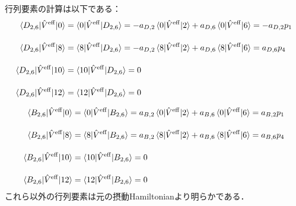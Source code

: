 行列要素の計算は以下である：
\begin{align}
    \langle{D_{2,6}|\hat{V}^{\rm{eff}}|0}\rangle
    &=\langle{0|\hat{V}^{\rm{eff}}|D_{2,6}}\rangle
    =-a_{D,2}\braket{0|\hat{V}^{\rm{eff}}|2}+a_{D,6}\braket{0|\hat{V}^{\rm{eff}}|6}
    =-a_{D,2}p_1\\[10pt]
    \langle{D_{2,6}|\hat{V}^{\rm{eff}}|8}\rangle
    &=\langle{8|\hat{V}^{\rm{eff}}|D_{2,6}}\rangle
    =-a_{D,2}\braket{8|\hat{V}^{\rm{eff}}|2}+a_{D,6}\braket{8|\hat{V}^{\rm{eff}}|6}
    =a_{D,6}p_4\\[10pt]
    \langle{D_{2,6}|\hat{V}^{\rm{eff}}|10}\rangle
    &=\langle{10|\hat{V}^{\rm{eff}}|D_{2,6}}\rangle
    =0\\[10pt]
    \langle{D_{2,6}|\hat{V}^{\rm{eff}}|12}\rangle
    &=\langle{12|\hat{V}^{\rm{eff}}|D_{2,6}}\rangle
    =0
\end{align}


\begin{align}
    \langle{B_{2,6}|\hat{V}^{\rm{eff}}|0}\rangle
    &=\langle{0|\hat{V}^{\rm{eff}}|B_{2,6}}\rangle
    =a_{B,2}\braket{0|\hat{V}^{\rm{eff}}|2}+a_{B,6}\braket{0|\hat{V}^{\rm{eff}}|6}
    =a_{B,2}p_1\\[10pt]
    \langle{B_{2,6}|\hat{V}^{\rm{eff}}|8}\rangle
    &=\langle{8|\hat{V}^{\rm{eff}}|B_{2,6}}\rangle
    =a_{B,2}\braket{8|\hat{V}^{\rm{eff}}|2}+a_{B,6}\braket{8|\hat{V}^{\rm{eff}}|6}
    =a_{B,6}p_4\\[10pt]
    \langle{B_{2,6}|\hat{V}^{\rm{eff}}|10}\rangle
    &=\langle{10|\hat{V}^{\rm{eff}}|B_{2,6}}\rangle
    =0\\[10pt]
    \langle{B_{2,6}|\hat{V}^{\rm{eff}}|12}\rangle
    &=\langle{12|\hat{V}^{\rm{eff}}|B_{2,6}}\rangle
    =0
\end{align}
これら以外の行列要素は元の摂動Hamiltonianより明らかである．

